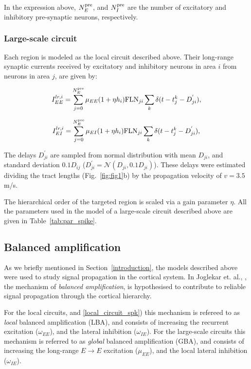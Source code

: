 \noindent In the expression above, $N_E^{\rm pre}$, and $N_I^{\rm pre}$ are the number of excitatory and inhibitory pre-synaptic neurons, respectively.

\subsubsection{Large-scale circuit}\label{lr_spk} Each region is modeled as the local circuit described above. Their long-range synaptic currents received by excitatory and inhibitory neurons in area $i$ from neurons in area $j$, are given by:

\begin{equation}
    I^{lr,i}_{EE} = \sum_{j=0}^{N_E^{\rm pre}}\mu_{EE}(1+\eta h_{i})\text{FLN}_{ji}\sum_{k}\delta(t-t_{j}^{k}-D^{'}_{ji}),
    \label{eq:lr_ee_spk}
\end{equation}

\begin{equation}
    I^{lr,i}_{EI} = \sum_{j=0}^{N_E^{\rm pre}}\mu_{EI}(1+\eta h_{i})\text{FLN}_{ji}\sum_{k}\delta(t-t_{j}^{k}-D^{'}_{ji}),
    \label{eq:lr_ei_spk}
\end{equation}

\noindent  The delays $D^{'}_{ji}$ are sampled from normal distribution with mean $D_{ji}$, and standard deviation $0.1D_{ij}$ ($D^{'}_{ji} = \mathcal{N}(D_{ji}, 0.1D_{ji})$). These delays were estimated dividing the tract lengths (Fig.~\ref{fig:fig1}b) by the propagation velocity of $v=3.5$ m/s. 

The hierarchical order of the targeted region is scaled via a gain parameter $\eta$. All the parameters used in the model of a large-scale circuit described above are given in Table~\ref{tab:par_spike}.

\subsection{Balanced amplification}\label{gba}

As we briefly mentioned in Section~\ref{introduction}, the models described above were used to study signal propagation in the cortical system. In Joglekar et. al., \cite{joglekar2018inter}, the mechanism of \emph{balanced amplification}, is hypothesised to contribute to reliable signal propagation through the cortical hierarchy.

For the local circuits, and \ref{local_circuit_spk}) this mechanism is refereed to as \emph{local} balanced amplification (LBA), and consists of increasing the recurrent excitation ($\omega_{EE}$), and the lateral inhibition ($\omega_{IE}$). For the large-scale circuits this mechanism is referred to as \emph{global} balanced amplification (GBA), and consists of increasing the long-range $E\rightarrow E$ excitation  ($\mu_{EE}$), and the local lateral inhibition ($\omega_{IE}$).

